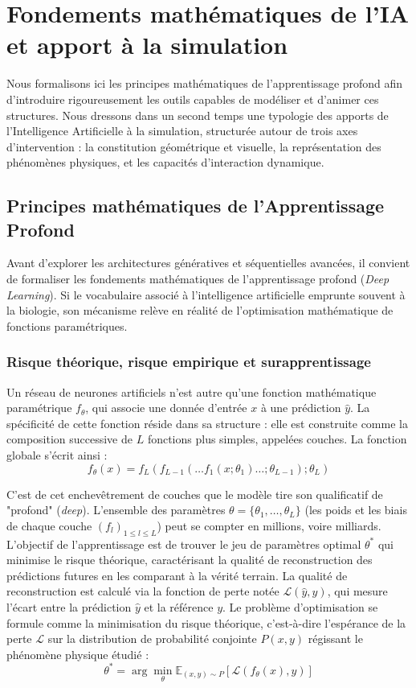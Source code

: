 \section{Fondements mathématiques de l’IA et apport à la simulation}
Nous formalisons ici les principes mathématiques de l'apprentissage profond afin d'introduire rigoureusement les outils capables de modéliser et d'animer ces structures. Nous dressons dans un second temps  une typologie des apports de l’Intelligence Artificielle à la simulation, structurée autour de trois axes d’intervention : la constitution géométrique et visuelle, la représentation des phénomènes physiques, et les capacités d’interaction dynamique.

\subsection{Principes mathématiques de l'Apprentissage Profond}
Avant d'explorer les architectures génératives et séquentielles avancées, il convient de formaliser les fondements mathématiques de l'apprentissage profond (\textit{Deep Learning}). Si le vocabulaire associé à l'intelligence artificielle emprunte souvent à la biologie, son mécanisme relève en réalité de l'optimisation mathématique de fonctions paramétriques.

\subsubsection{Risque théorique, risque empirique et surapprentissage}
Un réseau de neurones artificiels n'est autre qu'une fonction mathématique paramétrique $f_\theta$, qui associe une donnée d'entrée $x$ à une prédiction $\hat{y}$. La spécificité de cette fonction réside dans sa structure : elle est construite comme la composition successive de $L$ fonctions plus simples, appelées couches. La fonction globale s'écrit ainsi :
$$f_\theta(x) = f_L(f_{L-1}(\dots f_1(x; \theta_1) \dots ; \theta_{L-1}); \theta_L)$$

C'est de cet enchevêtrement de couches que le modèle tire son qualificatif de "profond" (\textit{deep}). L'ensemble des paramètres $\theta = \{\theta_1, \dots, \theta_L\}$ (les poids et les biais de chaque couche $(f_l)_{1 \leq l \leq L}$) peut se compter en millions, voire milliards.\\

L'objectif de l'apprentissage est de trouver le jeu de paramètres optimal $\theta^*$ qui minimise le risque théorique, caractérisant la qualité de reconstruction des prédictions futures en les comparant à la vérité terrain. La qualité de reconstruction est calculé via la fonction de perte notée $\mathcal{L}(\hat{y}, y)$, qui mesure l’écart entre la prédiction $\hat{y}$ et la référence $y$. Le problème d'optimisation se formule comme la minimisation du risque théorique, c'est-à-dire l'espérance de la perte $\mathcal{L}$ sur la distribution de probabilité conjointe $P(x,y)$ régissant le phénomène physique étudié :
$$\theta^* = \arg\min_\theta \mathbb{E}_{(x,y) \sim P}[\mathcal{L}(f_\theta(x), y)]$$

